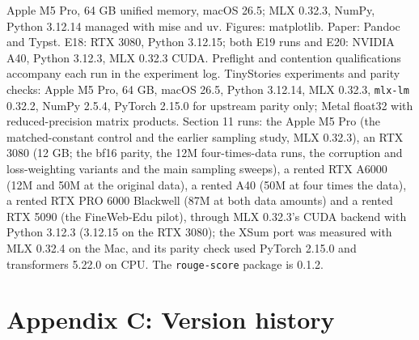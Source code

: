 \documentclass[
  british,
]{article}
\begin{document}
Apple M5 Pro, 64 GB unified memory, macOS 26.5; MLX 0.32.3, NumPy,
Python 3.12.14 managed with mise and uv. Figures: matplotlib. Paper:
Pandoc and Typst. E18: RTX 3080, Python 3.12.15; both E19 runs and E20:
NVIDIA A40, Python 3.12.3, MLX 0.32.3 CUDA. Preflight and contention
qualifications accompany each run in the experiment log. TinyStories
experiments and parity checks: Apple M5 Pro, 64 GB, macOS 26.5, Python
3.12.14, MLX 0.32.3, \texttt{mlx-lm} 0.32.2, NumPy 2.5.4, PyTorch 2.15.0
for upstream parity only; Metal float32 with reduced-precision matrix
products. Section 11 runs: the Apple M5 Pro (the matched-constant
control and the earlier sampling study, MLX 0.32.3), an RTX 3080 (12 GB;
the bf16 parity, the 12M four-times-data runs, the corruption and
loss-weighting variants and the main sampling sweeps), a rented RTX
A6000 (12M and 50M at the original data), a rented A40 (50M at four
times the data), a rented RTX PRO 6000 Blackwell (87M at both data
amounts) and a rented RTX 5090 (the FineWeb-Edu pilot), through MLX
0.32.3's CUDA backend with Python 3.12.3 (3.12.15 on the RTX 3080); the
XSum port was measured with MLX 0.32.4 on the Mac, and its parity check
used PyTorch 2.15.0 and transformers 5.22.0 on CPU. The
\texttt{rouge-score} package is 0.1.2.

\section*{Appendix C: Version history}\label{appendix-c-version-history}
\end{document}
